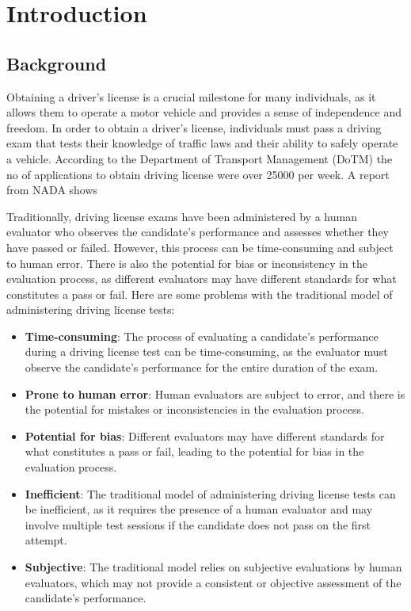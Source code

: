 

\newpage
{} %

\chapter{Introduction}
\section{Background}\label{sec:bkgrnd}%
 Obtaining a driver's license is a crucial milestone for many individuals, as it allows them to operate a motor vehicle and provides a sense of independence and freedom. In order to obtain a driver's license, individuals must pass a driving exam that tests their knowledge of traffic laws and their ability to safely operate a vehicle. According to the Department of Transport Management (DoTM) the no of applications to obtain driving license were over 25000 per week. A report from NADA shows 

Traditionally, driving license exams have been administered by a human evaluator who observes the candidate's performance and assesses whether they have passed or failed. However, this process can be time-consuming and subject to human error. There is also the potential for bias or inconsistency in the evaluation process, as different evaluators may have different standards for what constitutes a pass or fail.
Here are some problems with the traditional model of administering driving license tests:
\begin{itemize}
\item \textbf{Time-consuming}: The process of evaluating a candidate's performance during a driving license test can be time-consuming, as the evaluator must observe the candidate's performance for the entire duration of the exam.
\item \textbf{Prone to human error}: Human evaluators are subject to error, and there is the potential for mistakes or inconsistencies in the evaluation process.
\item \textbf{Potential for bias}: Different evaluators may have different standards for what constitutes a pass or fail, leading to the potential for bias in the evaluation process.
\item \textbf{Inefficient}: The traditional model of administering driving license tests can be inefficient, as it requires the presence of a human evaluator and may involve multiple test sessions if the candidate does not pass on the first attempt.
\item \textbf{Subjective}: The traditional model relies on subjective evaluations by human evaluators, which may not provide a consistent or objective assessment of the candidate's performance.
\end{itemize}

